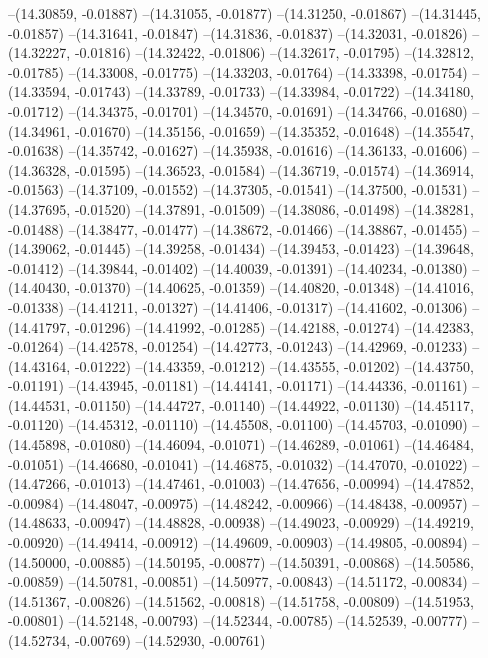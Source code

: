 --(14.30859, -0.01887)
--(14.31055, -0.01877)
--(14.31250, -0.01867)
--(14.31445, -0.01857)
--(14.31641, -0.01847)
--(14.31836, -0.01837)
--(14.32031, -0.01826)
--(14.32227, -0.01816)
--(14.32422, -0.01806)
--(14.32617, -0.01795)
--(14.32812, -0.01785)
--(14.33008, -0.01775)
--(14.33203, -0.01764)
--(14.33398, -0.01754)
--(14.33594, -0.01743)
--(14.33789, -0.01733)
--(14.33984, -0.01722)
--(14.34180, -0.01712)
--(14.34375, -0.01701)
--(14.34570, -0.01691)
--(14.34766, -0.01680)
--(14.34961, -0.01670)
--(14.35156, -0.01659)
--(14.35352, -0.01648)
--(14.35547, -0.01638)
--(14.35742, -0.01627)
--(14.35938, -0.01616)
--(14.36133, -0.01606)
--(14.36328, -0.01595)
--(14.36523, -0.01584)
--(14.36719, -0.01574)
--(14.36914, -0.01563)
--(14.37109, -0.01552)
--(14.37305, -0.01541)
--(14.37500, -0.01531)
--(14.37695, -0.01520)
--(14.37891, -0.01509)
--(14.38086, -0.01498)
--(14.38281, -0.01488)
--(14.38477, -0.01477)
--(14.38672, -0.01466)
--(14.38867, -0.01455)
--(14.39062, -0.01445)
--(14.39258, -0.01434)
--(14.39453, -0.01423)
--(14.39648, -0.01412)
--(14.39844, -0.01402)
--(14.40039, -0.01391)
--(14.40234, -0.01380)
--(14.40430, -0.01370)
--(14.40625, -0.01359)
--(14.40820, -0.01348)
--(14.41016, -0.01338)
--(14.41211, -0.01327)
--(14.41406, -0.01317)
--(14.41602, -0.01306)
--(14.41797, -0.01296)
--(14.41992, -0.01285)
--(14.42188, -0.01274)
--(14.42383, -0.01264)
--(14.42578, -0.01254)
--(14.42773, -0.01243)
--(14.42969, -0.01233)
--(14.43164, -0.01222)
--(14.43359, -0.01212)
--(14.43555, -0.01202)
--(14.43750, -0.01191)
--(14.43945, -0.01181)
--(14.44141, -0.01171)
--(14.44336, -0.01161)
--(14.44531, -0.01150)
--(14.44727, -0.01140)
--(14.44922, -0.01130)
--(14.45117, -0.01120)
--(14.45312, -0.01110)
--(14.45508, -0.01100)
--(14.45703, -0.01090)
--(14.45898, -0.01080)
--(14.46094, -0.01071)
--(14.46289, -0.01061)
--(14.46484, -0.01051)
--(14.46680, -0.01041)
--(14.46875, -0.01032)
--(14.47070, -0.01022)
--(14.47266, -0.01013)
--(14.47461, -0.01003)
--(14.47656, -0.00994)
--(14.47852, -0.00984)
--(14.48047, -0.00975)
--(14.48242, -0.00966)
--(14.48438, -0.00957)
--(14.48633, -0.00947)
--(14.48828, -0.00938)
--(14.49023, -0.00929)
--(14.49219, -0.00920)
--(14.49414, -0.00912)
--(14.49609, -0.00903)
--(14.49805, -0.00894)
--(14.50000, -0.00885)
--(14.50195, -0.00877)
--(14.50391, -0.00868)
--(14.50586, -0.00859)
--(14.50781, -0.00851)
--(14.50977, -0.00843)
--(14.51172, -0.00834)
--(14.51367, -0.00826)
--(14.51562, -0.00818)
--(14.51758, -0.00809)
--(14.51953, -0.00801)
--(14.52148, -0.00793)
--(14.52344, -0.00785)
--(14.52539, -0.00777)
--(14.52734, -0.00769)
--(14.52930, -0.00761)
